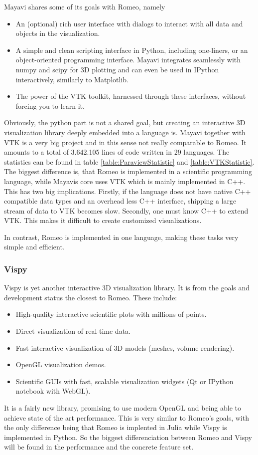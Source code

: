 Mayavi shares some of its goals with Romeo, namely\cite{MayaviGoals}
\begin{itemize}
	\item An (optional) rich user interface with dialogs to interact with all data and objects in the visualization.
	\item A simple and clean scripting interface in Python, including one-liners, or an object-oriented programming interface. Mayavi integrates seamlessly with numpy and scipy for 3D plotting and can even be used in IPython interactively, similarly to Matplotlib.
	\item The power of the VTK toolkit, harnessed through these interfaces, without forcing you to learn it.
\end{itemize}
Obviously, the python part is not a shared goal, but creating an interactive 3D visualization library deeply embedded into a language is.
Mayavi together with VTK is a very big project and in this sense not really comparable to Romeo.
It amounts to a total of 3.642.105 lines of code written in 29 languages. The statistics can be found in table \ref{table:ParaviewStatistic} and \ref{table:VTKStatistic}.
The biggest difference is, that Romeo is implemented in a scientific programming language, while Mayavis core uses VTK which is mainly implemented in C++.
This has two big implications.
Firstly, if the language does not have native C++ compatible data types and an overhead less C++ interface, shipping a large stream of data to VTK becomes slow.
Secondly, one must know C++ to extend VTK. This makes it difficult to create customized visualizations.

In contrast, Romeo is implemented in one language, making these tasks very simple and efficient.


\subsubsection{Vispy}

Vispy is yet another interactive 3D visualization library. It is from the goals and development status the closest to Romeo.
These include\cite{VispyGoals}:

\begin{itemize}
	\item High-quality interactive scientific plots with millions of points.
	\item Direct visualization of real-time data.
	\item Fast interactive visualization of 3D models (meshes, volume rendering).
	\item OpenGL visualization demos.
	\item Scientific GUIs with fast, scalable visualization widgets (Qt or IPython notebook with WebGL).
\end{itemize}

It is a fairly new library, promising to use modern OpenGL and being able to achieve state of the art performance.
This is very similar to Romeo's goals, with the only difference being that Romeo is implented in Julia while Vispy is implemented in Python.
So the biggest differenciation between Romeo and Vispy will be found in the performance and the concrete feature set.

